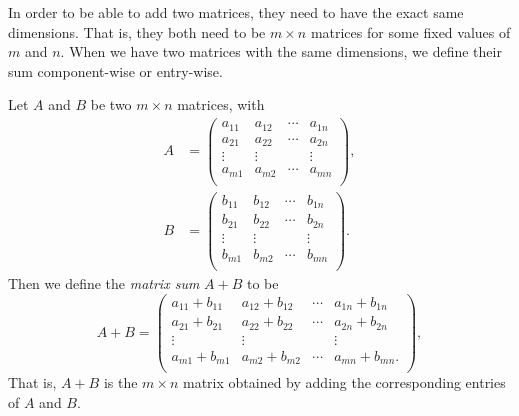\documentclass{ximera}
\begin{document}
In order to be able to add two matrices, they need to have the exact same dimensions. That is, they both need to be $m\times n$ matrices for some fixed values of $m$ and $n$. When we have two matrices with the same dimensions, we define their sum component-wise or entry-wise.

\begin{definition}
Let $A$ and $B$ be two $m\times n$ matrices, with 
\begin{align*}
A &= \left(\begin{array}{cccc}
a_{11}& a_{12} & \cdots & a_{1n}\\
a_{21}& a_{22} & \cdots & a_{2n}\\
\vdots & \vdots & & \vdots\\
a_{m1}& a_{m2} & \cdots & a_{mn}\\
\end{array}\right), \\
B &= \left(\begin{array}{cccc}
b_{11}& b_{12} & \cdots & b_{1n}\\
b_{21}& b_{22} & \cdots & b_{2n}\\
\vdots & \vdots & & \vdots\\
b_{m1}& b_{m2} & \cdots & b_{mn}\\
\end{array}\right).
\end{align*}
Then we define the \emph{matrix sum} $A+B$ to be
\[
A+B = \left(\begin{array}{cccc}
a_{11}+b_{11}& a_{12}+b_{12} & \cdots & a_{1n}+b_{1n}\\
a_{21}+b_{21}& a_{22}+b_{22} & \cdots & a_{2n}+b_{2n}\\
\vdots & \vdots & & \vdots\\
a_{m1}+b_{m1}& a_{m2}+b_{m2} & \cdots & a_{mn}+b_{mn}.\\
\end{array}\right), 
\]
That is, $A+B$ is the $m\times n$ matrix obtained by adding the corresponding entries of $A$ and $B$.
\end{definition}
\end{document}

